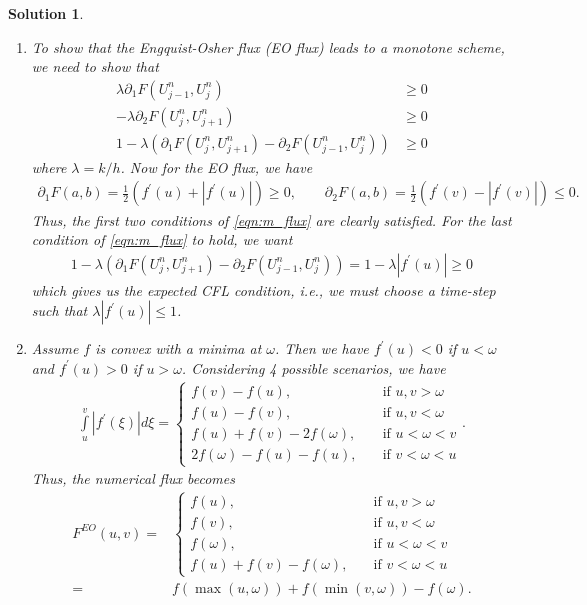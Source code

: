 \documentclass[10pt,letterpaper]{article}
\theoremstyle{break}
\newtheorem{mysolution}{Solution}
\newenvironment{solution}{\begin{mysolution}}{\end{mysolution}}
\begin{document}
\begin{solution}
	\begin{enumerate}
		\item
		To show that the Engquist-Osher flux (EO flux) leads to a monotone scheme, we need to show that
		\begin{align} \label{eqn:m_flux}
			\lambda \partial_1F(U^n_{j-1},U^n_j) &\geq 0\\
			-\lambda \partial_2F(U^n_{j},U^n_{j+1}) &\geq 0\\
			1 - \lambda ( \partial_1F(U^n_{j},U^n_{j+1}) - \partial_2F(U^n_{j-1},U^n_j) ) &\geq 0
		\end{align}
		where $\lambda = k/h$. Now for the EO flux, we have
		\begin{gather}
		\partial_1 F(a,b) = \frac{1}{2} \left( f^\prime(u) + |f^\prime(u)| \right) \geq 0, \qquad 
		\partial_2 F(a,b) = \frac{1}{2} \left( f^\prime(v) - |f^\prime(v)| \right) \leq 0.
		\end{gather}
		Thus, the first two conditions of \eqref{eqn:m_flux} are clearly satisfied. For the last condition of \eqref{eqn:m_flux} to hold, we want
		\begin{gather}
		1 - \lambda ( \partial_1F(U^n_{j},U^n_{j+1}) - \partial_2F(U^n_{j-1},U^n_j) ) = 1 - \lambda |f^\prime(u)| \geq 0 
		\end{gather}
		which gives us the expected CFL condition, i.e., we must choose a time-step such that $\lambda |f^\prime(u)| \leq 1$.
		
		\item Assume $f$ is convex with a minima at $\omega$. Then we have $f^\prime(u) < 0$ if $u < \omega$ and $f^\prime(u) > 0$ if $u > \omega$. Considering 4 possible scenarios, we have
		\begin{align}
			\int \limits_u^v |f^\prime(\xi) | d \xi = \begin{cases}
				f(v) - f(u), & \quad \text{if } u,v > \omega\\
				f(u) - f(v), & \quad \text{if } u,v < \omega\\
				f(u) + f(v) - 2f(\omega), & \quad \text{if } u < \omega < v \\
				2 f(\omega) - f(u) - f(u), & \quad \text{if } v < \omega < u
			\end{cases}.
		\end{align}
		Thus, the numerical flux becomes 
		\begin{align}
			F^{EO}(u,v) =& \begin{cases}
			f(u), & \quad \text{if } u,v > \omega\\
			f(v), & \quad \text{if } u,v < \omega\\
			f(\omega), & \quad \text{if } u < \omega < v \\
			f(u) + f(v) - f(\omega), & \quad \text{if } v < \omega < u
			\end{cases}\\
			=& f(\max(u,\omega)) + f(\min(v,\omega)) - f(\omega).
		\end{align}
	\end{enumerate}
\end{solution}
\end{document}

